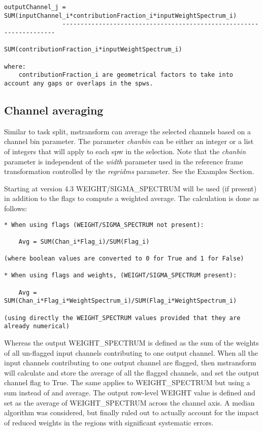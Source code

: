 \begin{verbatim}
outputChannel_j = SUM(inputChannel_i*contributionFraction_i*inputWeightSpectrum_i) 
                --------------------------------------------------------------------
                        SUM(contributionFraction_i*inputWeightSpectrum_i)

where:
    contributionFraction_i are geometrical factors to take into account any gaps or overlaps in the spws.
\end{verbatim}

\subsection{Channel averaging}
Similar to task split, mstransform can average the selected channels based on a
channel bin parameter. The parameter {\it chanbin} can be either an integer or a list of
integers that will apply to each spw in the selection. Note that the {\it chanbin}
parameter is independent of the {\it width} parameter used in the reference frame
transformation controlled by the {\it regridms} parameter. See the Examples Section.

Starting at  version 4.3 WEIGHT/SIGMA\_SPECTRUM will be used (if present) in
addition to the flags to compute a weighted average. The calculation is
done as follows:

\begin{verbatim}
* When using flags (WEIGHT/SIGMA_SPECTRUM not present):

    Avg = SUM(Chan_i*Flag_i)/SUM(Flag_i)     
    
(where boolean values are converted to 0 for True and 1 for False)

* When using flags and weights, (WEIGHT/SIGMA_SPECTRUM present):

    Avg = SUM(Chan_i*Flag_i*WeightSpectrum_i)/SUM(Flag_i*WeightSpectrum_i)
         
(using directly the WEIGHT_SPECTRUM values provided that they are already numerical)

\end{verbatim}

Whereas the output WEIGHT\_SPECTRUM is defined as the sum of the
weights of all un-flagged input channels contributing to one output channel.
When all the input channels contributing to one output channel are flagged,
then mstransform will calculate and store the average of all the flagged
channels, and set the output channel flag to True. The same applies to
WEIGHT\_SPECTRUM but using a sum instead of and average.
The output row-level WEIGHT value is defined and set as the average of
WEIGHT\_SPECTRUM across the channel axis. A median algorithm was
considered, but finally ruled out to actually account for the impact of
reduced weights in the regions with significant systematic errors.

